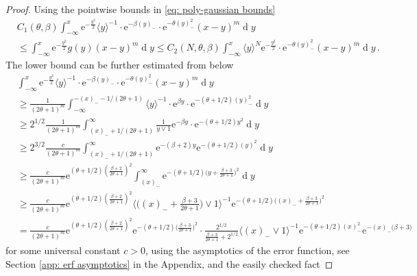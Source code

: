 \documentclass[11pt, reqno]{amsart}
\numberwithin{equation}{section}
\newcommand{\diff}{\ensuremath{\operatorname{d}\!}}
\begin{document}
\begin{proof}
Using the pointwise bounds in \ref{eq: poly-gaussian bounds}
    \begin{align*}
             & C_1(\theta, \beta)\displaystyle\int^x_{-\infty}\mathrm{e}^{-\frac{y^2}{2}}\langle y\rangle^{-1}\cdot\mathrm{e}^{-\beta(y)_-}\cdot \mathrm{e}^{-\theta(y)^2_-} (x-y)^m\diff y\\
             & \le\displaystyle\int^x_{-\infty}\mathrm{e}^{-\frac{y^2}{2}}g(y)(x-y)^m\diff y\le C_2(N, \theta, \beta)\displaystyle\int^x_{-\infty}\langle y\rangle ^N\mathrm{e}^{-\frac{y^2}{2}}\cdot \mathrm{e}^{-\theta(y)^2_-} (x-y)^m\diff y\,.
    \end{align*}
The lower bound can be further estimated from below
    \begin{align*}
         &\displaystyle\int^x_{-\infty}\mathrm{e}^{-\frac{y^2}{2}}\langle y\rangle^{-1}\cdot \mathrm{e}^{-\beta(y)_-}\cdot\mathrm{e}^{-\theta(y)^2_-} (x-y)^m\diff y \\
         & \ge \frac{1}{(2\theta+1)^m}\displaystyle\int^{-(x)_- -1/(2\theta + 1)}_{-\infty}\langle y\rangle^{-1}\cdot \mathrm{e}^{\beta y}\cdot \mathrm{e}^{-(\theta + 1/2)(y)^2_-}\diff y\\
         &\ge 2^{1/2} \frac{1}{(2\theta+1)^m}\displaystyle\int_{(x)_- +1/(2\theta + 1)}^{\infty} \frac{1}{y\lor 1}\mathrm{e}^{-\beta y}\cdot\mathrm{e}^{-(\theta + 1/2)y^2}\diff y\\
         & \ge2^{3/2}\frac{c}{(2\theta+1)^m}\displaystyle\int_{(x)_- + 1/(2\theta + 1)}^{\infty}\mathrm{e}^{-(\beta + 2) y} \mathrm{e}^{-(\theta + 1/2)(y)^2}\diff y\\
         & \ge \frac{c}{(2\theta+1)^m}\mathrm{e}^{(\theta + 1/2)(\frac{\beta+2}{2\theta +1})^2}\displaystyle\int_{(x)_- }^{\infty}\mathrm{e}^{-(\theta + 1/2)\big(y +\frac{\beta+3}{2\theta +1}\big)^2}\diff y\\
         & \ge \frac{c}{(2\theta+1)^m}\mathrm{e}^{(\theta + 1/2)(\frac{\beta+2}{2\theta +1})^2}\langle \big((x)_-+\frac{\beta+3}{2\theta +1}\big)\lor 1 \rangle ^{-1} \mathrm{e}^{-(\theta + 1/2)\big((x)_- +\frac{\beta+3}{2\theta +1}\big)^2}\\
         & = \frac{c}{(2\theta+1)^m}\mathrm{e}^{(\theta + 1/2)(\frac{\beta+2}{2\theta +1})^2}\mathrm{e}^{-(\theta + 1/2)\big(\frac{\beta+3}{2\theta +1}\big)^2}\cdot \frac{2^{1/2}}{\frac{\beta+3}{2\theta +1} +  2^{1/2}}\langle (x)_-\lor 1 \rangle ^{-1} \mathrm{e}^{-(\theta + 1/2)(x)_-^2}\mathrm{e}^{-(x)_-\big(\beta+3\big)}
    \end{align*}
    for some universal constant $c>0$, using the asymptotics of the error function, see Section \ref{app: erf asymptotics} in the Appendix, and the easily checked fact 

\end{proof}
\end{document}
